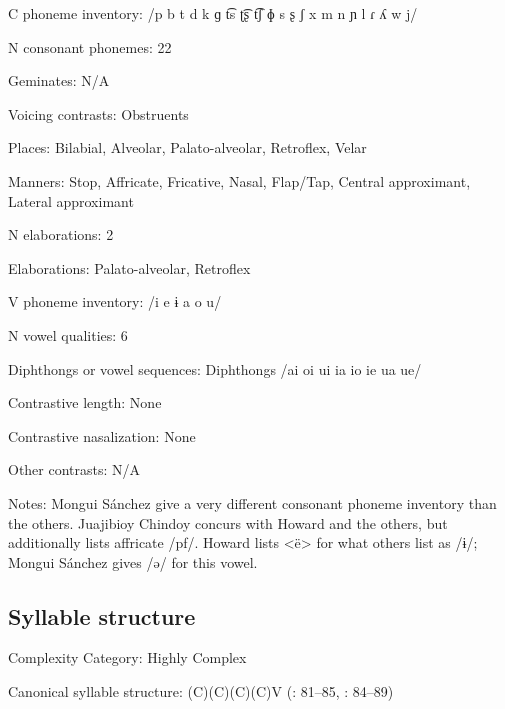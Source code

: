 {\begin{appendixdesc}
\item[C phoneme inventory:] /p b t d k ɡ t͡s ʈ͡ʂ t͡ʃ ɸ s ʂ ʃ x m n ɲ l ɾ ʎ w j/

\item[N consonant phonemes:] 22

\item[Geminates:] N/A

\item[Voicing contrasts:] Obstruents

\item[Places:] Bilabial, Alveolar, Palato-alveolar, Retroflex, Velar

\item[Manners:] Stop, Affricate, Fricative, Nasal, Flap/Tap, Central approximant, Lateral approximant

\item[N elaborations:] 2

\item[Elaborations:] Palato-alveolar, Retroflex

\item[V phoneme inventory:] /i e ɨ a o u/

\item[N vowel qualities:] 6

\item[Diphthongs or vowel sequences:] Diphthongs /ai oi ui ia io ie ua ue/

\item[Contrastive length:] None

\item[Contrastive nasalization:] None

\item[Other contrasts:] N/A

\item[Notes:] Mongui Sánchez give a very different consonant phoneme inventory than the others. Juajibioy Chindoy concurs with Howard and the others, but additionally lists affricate /pf/. Howard lists <ë> for what others list as /ɨ/; Mongui Sánchez gives /ə/ for this vowel.
\end{appendixdesc}
\subsection*{Syllable structure}
\begin{appendixdesc}

\item[Complexity Category:] Highly Complex

\item[Canonical syllable structure:] (C)(C)(C)(C)V (\citealt{Howard1967}: 81--85, \citealt{Howard1972}: 84--89)


\end{appendixdesc}}

